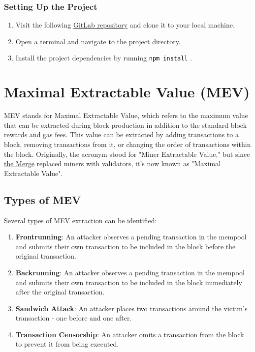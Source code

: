 \documentclass[12pt]{article}
\newcommand{\codegrey}[1]{%
  \texttt{\colorbox{black!4}{\textcolor{black}{#1}}}%
}
\begin{document}
\subsubsection*{Setting Up the Project}

\begin{enumerate}
    \item Visit the following \href{https://gitlab.fel.cvut.cz/radovluk/smart-contracts-exercises/-/tree/main/08-Maximal-Extractable-Value/task/task-code}{GitLab repository} and clone it to your local machine.
    \item Open a terminal and navigate to the project directory.
    \item Install the project dependencies by running \codegrey{npm install}.
\end{enumerate}

\section{Maximal Extractable Value (MEV)}

MEV stands for Maximal Extractable Value, which refers to the maximum value that can be extracted during block production in addition to the standard block rewards and gas fees. This value can be extracted by adding transactions to a block, removing transactions from it, or changing the order of transactions within the block. Originally, the acronym stood for "Miner Extractable Value," but since \href{https://ethereum.org/en/roadmap/merge/}{the Merge} replaced miners with validators, it's now known as "Maximal Extractable Value".

\subsection*{Types of MEV}

Several types of MEV extraction can be identified:

\begin{enumerate}
  \item \textbf{Frontrunning}: An attacker observes a pending transaction in the mempool and submits their own transaction to be included in the block before the original transaction.
  \item \textbf{Backrunning}: An attacker observes a pending transaction in the mempool and submits their own transaction to be included in the block immediately after the original transaction.
  \item \textbf{Sandwich Attack}: An attacker places two transactions around the victim's transaction - one before and one after.
  \item \textbf{Transaction Censorship}: An attacker omits a transaction from the block to prevent it from being executed.
\end{enumerate}
\end{document}
